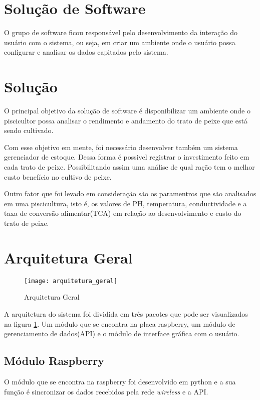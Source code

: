 \section{Solução de Software}
O grupo de software ficou responsável pelo desenvolvimento da interação do usuário com o sistema, ou seja, em criar um ambiente onde o usuário possa configurar e analisar os dados capitados pelo sistema.

\section{Solução}
O principal objetivo da solução de software é disponibilizar um ambiente onde o piscicultor possa analisar o rendimento e andamento do trato de peixe que está sendo cultivado.

Com esse objetivo em mente, foi necessário desenvolver também um sistema gerenciador de estoque. Dessa forma é possivel registrar o investimento feito em cada trato de peixe. Possibilitando assim uma análise de qual ração tem o melhor custo benefício no cultivo de peixe.

Outro fator que foi levado em consideração são os paramentros que são analisados em uma piscicultura, isto é, os valores de PH, temperatura, conductividade e a taxa de conversão alimentar(TCA) em relação ao desenvolvimento e custo do trato de peixe.

\section{Arquitetura Geral}

\begin{figure}[H]
    \centering
    \texttt{[image: arquitetura\_geral]}
    \caption{Arquitetura Geral}
    \label{fig:arquitetura_geral}
\end{figure}

A arquitetura do sistema foi dividida em três pacotes que pode ser visualizados na figura \ref{fig:arquitetura_geral}. Um módulo que se encontra na placa raspberry, um módulo de gerenciamento de dados(API) e o módulo de interface gráfica com o usuário.

\subsection{Módulo Raspberry}

O módulo que se encontra na raspberry foi desenvolvido em python e a sua função é sincronizar os dados recebidos pela rede \textit{wireless} e a API.

